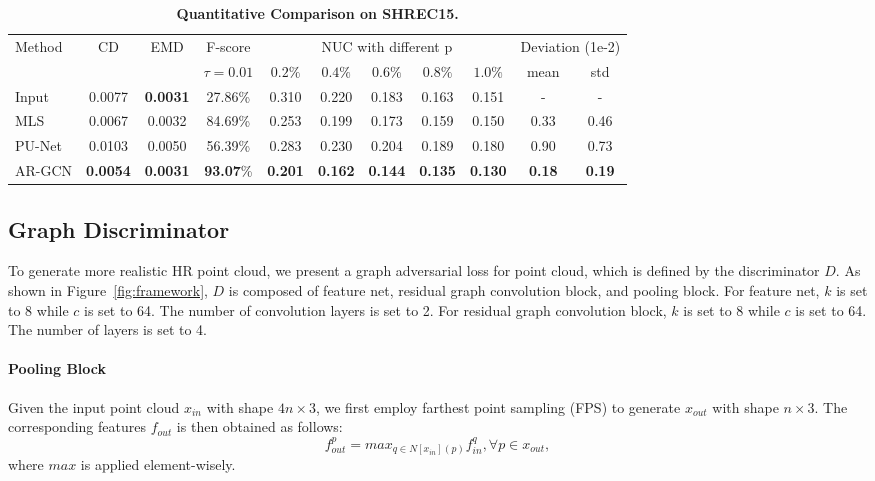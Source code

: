 \documentclass[10pt,twocolumn,letterpaper]{article}
\begin{document}
\begin{table*}[ht]
\begin{center}
\begin{tabular}{l|cc|c|ccccc|cc}
\hline
\multirow{2}{*}{Method} & \multirow{2}{*}{CD} & \multirow{2}{*}{EMD} & \multicolumn{1}{c}{F-score} & \multicolumn{5}{|c}{NUC with different p} & \multicolumn{2}{|c}{Deviation (1e-2)}\\
\cline{4-11}
& & & $\tau=0.01$ & $0.2\%$ & $0.4\%$ & $0.6\%$ & $0.8\%$ & $1.0\%$ & mean & std \\
\hline
\hline
Input & 0.0077 & \textbf{0.0031} & 27.86\% & 0.310 & 0.220 & 0.183 & 0.163 & 0.151 & - & - \\
MLS~\cite{alexa2003computing} & 0.0067 & 0.0032 & 84.69\% & 0.253 & 0.199 & 0.173 & 0.159 & 0.150 & 0.33 & 0.46\\
PU-Net~\cite{yu2018pu} & 0.0103 & 0.0050 & 56.39\% & 0.283 & 0.230 & 0.204 & 0.189 & 0.180 & 0.90 & 0.73\\
\hline
AR-GCN & \textbf{0.0054} & \textbf{0.0031} & \textbf{93.07}\% & \textbf{0.201} & \textbf{0.162} & \textbf{0.144} & \textbf{0.135} & \textbf{0.130} & \textbf{0.18} & \textbf{0.19}\\
\hline
\end{tabular}
\end{center}
	\vspace{-1.5em}
	\caption{\textbf{Quantitative Comparison on SHREC15.}}
	\vspace{-1em}
	\label{table:shrec_result}
\end{table*}

\subsection{Graph Discriminator}
To generate more realistic HR point cloud, we present a graph adversarial loss for point cloud, which is defined by the discriminator $D$.
As shown in Figure~\ref{fig:framework}, $D$ is composed of feature net, residual graph convolution block, and pooling block.
For feature net, $k$ is set to 8 while $c$ is set to 64.
The number of convolution layers is set to 2.
For residual graph convolution block, $k$ is set to 8 while $c$ is set to 64.
The number of layers is set to 4.

\vspace{-1em}
\paragraph{Pooling Block}
Given the input point cloud $x_{in}$ with shape $4n\times3$, we first employ farthest point sampling (FPS) to generate $x_{out}$ with shape $n\times3$.
The corresponding features $f_{out}$ is then obtained as follows:
\begin{equation}
    f_{out}^p = max_{q\in N[x_{in}](p)}f_{in}^q, \forall p \in x_{out},
\end{equation}
where $max$ is applied element-wisely.
\end{document}
